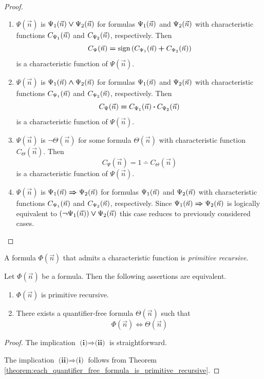 \documentclass[10pt]{amsart}
\newcommand{\mra}{\boldsymbol{\Rightarrow}}
\newcommand{\mequiv}{\boldsymbol{\Leftrightarrow}}
\newcommand{\mand}{\boldsymbol{\wedge}}
\newcommand{\mor}{\boldsymbol{\vee}}
\newcommand{\mneg}{\boldsymbol{\neg}}
\newcommand{\meq}{\boldsymbol{=}}
\newcommand{\mplus}{\boldsymbol{+}}
\newcommand{\mdot}{\boldsymbol{\cdot}}
\begin{document}
\begin{proof}
\begin{enumerate}[label=\textbf{(\arabic*)}, leftmargin=3.0em]
		\item $\Psi(\vec{n})$ is $\Psi_{\rm{1}}(\vec{n}) \mor \Psi_{\rm{2}}(\vec{n})$ for formulas $\Psi_{\rm{1}}(\vec{n})$ and $\Psi_{\rm{2}}(\vec{n})$ with characteristic functions $C_{\Psi_{\rm{1}}}(\vec{n})$ and $C_{\Psi_{\rm{2}}}(\vec{n})$, respectively. Then
		      $$C_{\Psi}(\vec{n}) \meq \mathrm{sign}\left(C_{\Psi_{\rm{1}}}(\vec{n}) \mplus C_{\Psi_{\rm{2}}}(\vec{n})\right)$$
		      is a characteristic function of $\Psi(\vec{n})$.
		\item $\Psi(\vec{n})$ is $\Psi_{\rm{1}}(\vec{n}) \mand \Psi_{\rm{2}}(\vec{n})$ for formulas $\Psi_{\rm{1}}(\vec{n})$ and $\Psi_{\rm{2}}(\vec{n})$ with characteristic functions $C_{\Psi_{\rm{1}}}(\vec{n})$ and $C_{\Psi_{\rm{2}}}(\vec{n})$, respectively. Then
		      $$C_{\Psi}(\vec{n}) \meq C_{\Psi_{\rm{1}}}(\vec{n}) \mdot C_{\Psi_{\rm{2}}}(\vec{n})$$
		      is a characteristic function of $\Psi(\vec{n})$.
		\item $\Psi(\vec{n})$ is $\mneg \Theta(\vec{n})$ for some formula $\Theta(\vec{n})$ with characteristic function $C_{\Theta}(\vec{n})$. Then
		      $$C_{\Psi}(\vec{n}) \meq 1 \dotminus C_{\Theta}(\vec{n})$$
		      is a characteristic function of $\Psi(\vec{n})$.
		\item $\Psi(\vec{n})$ is $\Psi_{\rm{1}}(\vec{n}) \mra \Psi_{\rm{2}}(\vec{n})$  for formulas $\Psi_{\rm{1}}(\vec{n})$ and $\Psi_{\rm{2}}(\vec{n})$ with characteristic functions $C_{\Psi_{\rm{1}}}(\vec{n})$ and $C_{\Psi_{\rm{2}}}(\vec{n})$, respectively. Since $\Psi_{\rm{1}}(\vec{n}) \mra \Psi_{\rm{2}}(\vec{n})$ is logically equivalent to $\left(\mneg \Psi_{\rm{1}}(\vec{n})\right) \mor \Psi_{\rm{2}}(\vec{n})$ this case reduces to previously considered cases.
	\end{enumerate}
\end{proof}

\begin{definition}
	A formula $\Phi(\vec{n})$ that admits a characteristic function is \textit{primitive recursive}.
\end{definition}

\begin{corollary}\label{corollary:primitive_recursive_are_equivalent_to_quantifier_free}
	Let $\Phi(\vec{n})$ be a formula. Then the following assertions are equivalent.
	\begin{enumerate}[label=\emph{\textbf{(\roman*)}}, leftmargin=3.0em]
		\item $\Phi(\vec{n})$ is primitive recursive.
		\item There exists a quantifier-free formula $\Theta(\vec{n})$ such that
		      $$\Phi(\vec{n}) \mequiv \Theta(\vec{n})$$
	\end{enumerate}
\end{corollary}
\begin{proof}
	The implication $\textbf{(i)} \Rightarrow \textbf{(ii)}$ is straightforward.

	The implication $\textbf{(ii)}\Rightarrow \textbf{(i)}$ follows from Theorem \ref{theorem:each_quantifier_free_formula_is_primitive_recursive}.
\end{proof}
\end{document}
